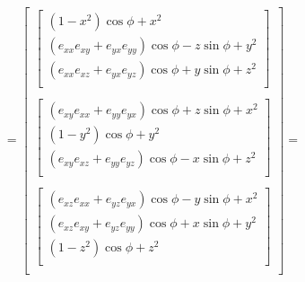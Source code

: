 \[
    =
    \begin{bmatrix}
        \begin{bmatrix}
            (1 - x^2) \cos \phi + x^2 \\
            (e_{xx} e_{xy} + e_{yx} e_{yy}) \cos \phi - z \sin \phi + y^2 \\
            (e_{xx} e_{xz} + e_{yx} e_{yz}) \cos \phi + y \sin \phi + z^2 \\
        \end{bmatrix} \\ \\
        \begin{bmatrix}
            (e_{xy} e_{xx} + e_{yy} e_{yx}) \cos \phi + z \sin \phi + x^2 \\
            (1 - y^2) \cos \phi + y^2 \\
            (e_{xy} e_{xz} + e_{yy} e_{yz}) \cos \phi - x \sin \phi + z^2 \\
        \end{bmatrix} \\ \\
        \begin{bmatrix}
            (e_{xz} e_{xx} + e_{yz} e_{yx}) \cos \phi - y \sin \phi + x^2 \\
            (e_{xz} e_{xy} + e_{yz} e_{yy}) \cos \phi + x \sin \phi + y^2 \\
            (1 - z^2) \cos \phi + z^2 \\
        \end{bmatrix} \\
    \end{bmatrix} =
\]
